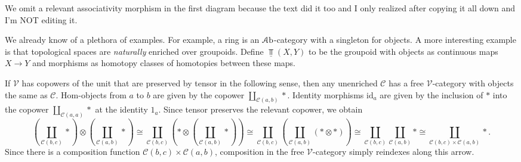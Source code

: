 We omit a relevant associativity morphism in the first diagram because the text did it too and I only realized after copying it all down and I'm NOT editing it.

We already know of a plethora of examples. For example, a ring is an $\mathcal{A}\mathrm{b}$-category with a singleton for objects. A more interesting example is that topological spaces are \emph{naturally} enriched over groupoids. Define $\underline{\Top }(X,Y)$ to be the groupoid with objects as continuous maps $X\to Y$ and morphisms as homotopy classes of homotopies between these maps.

If $\mathcal{V} $ has copowers of the unit that are preserved by tensor in the following sense, then any unenriched $\mathcal{C} $ has a free $\mathcal{V} $-category with objects the same as $\mathcal{C} $. Hom-objects from $a$ to $b$ are given by the copower $\coprod_{\mathcal{C} (a,b)} *$. Identity morphisms $\mathrm{id} _a$ are given by the inclusion of $*$ into the copower $\coprod_{\mathcal{C} (a,a)} *$ at the identity $1_a$. Since tensor preserves the relevant copower, we obtain
\[
	\left( \coprod_{\mathcal{C} (b,c)} *  \right) \otimes \left( \coprod_{\mathcal{C} (a,b)} * \right) \cong \coprod_{\mathcal{C} (b,c)} \left( *\otimes \left( \coprod_{\mathcal{C} (a,b)} * \right)  \right) \cong \coprod_{\mathcal{C} (b,c)} \left( \coprod_{\mathcal{C} (a,b)} \left( *\otimes * \right)  \right) \cong \coprod_{\mathcal{C} (b,c)} \coprod_{\mathcal{C} (a,b)} *\cong \coprod_{\mathcal{C} (b,c)\times \mathcal{C} (a,b)} *
.\]
Since there is a composition function $\mathcal{C} (b,c)\times \mathcal{C} (a,b)$, composition in the free $\mathcal{V} $-category simply reindexes along this arrow.

